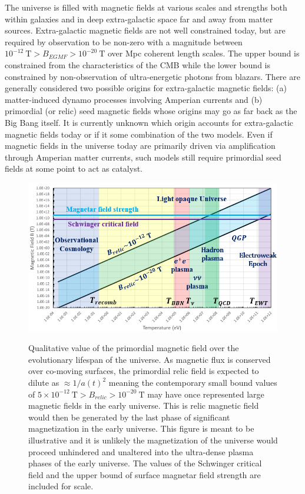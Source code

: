 \documentclass[Universe,article,submit,moreauthors,pdftex]{Definitions/mdpi}
\begin{document}
The universe is filled with magnetic fields at various scales and strengths both within galaxies and in deep extra-galactic space far and away from matter sources. Extra-galactic magnetic fields are not well constrained today, but are required by observation to be non-zero with a magnitude between $10^{-12}\ \mathrm{T}>B_{EGMF}>10^{-20}\ \mathrm{T}$ over Mpc coherent length scales. The upper bound is constrained from the characteristics of the CMB while the lower bound is constrained by non-observation of ultra-energetic photons from blazars. There are generally considered two possible origins for extra-galactic magnetic fields: (a) matter-induced dynamo processes involving Amperian currents and (b) primordial (or relic) seed magnetic fields whose origins may go as far back as the Big Bang itself. It is currently unknown which origin accounts for extra-galactic magnetic fields today or if it some combination of the two models. Even if magnetic fields in the universe today are primarily driven via amplification through Amperian matter currents, such models still require primordial seed fields at some point to act as catalyst.
\begin{figure}[t]
  \includegraphics[scale=0.75]{./plots/relic_plot.PNG}
  \label{fig1}
  \caption{Qualitative value of the primordial magnetic field over the evolutionary lifespan of the universe. As magnetic flux is conserved over co-moving surfaces, the primordial relic field is expected to dilute as $\approx1/a(t)^{2}$ meaning the contemporary small bound values of $5\times10^{-12}\ \mathrm{T}>B_{relic}>10^{-20}\ \mathrm{T}$ may have once represented large magnetic fields in the early universe. This is relic magnetic field would then be generated by the last phase of significant magnetization in the early universe. This figure is meant to be illustrative and it is unlikely the magnetization of the universe would proceed unhindered and unaltered into the ultra-dense plasma phases of the early universe. The values of the Schwinger critical field and the upper bound of surface magnetar field strength are included for scale.}
  \centering
\end{figure}
\end{document}
